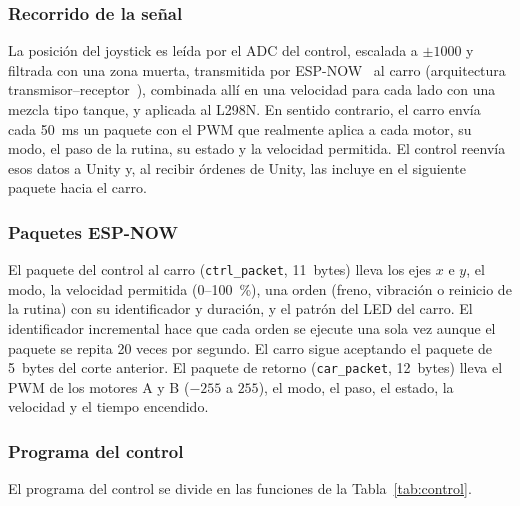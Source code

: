 \documentclass[journal]{IEEEtran}
\begin{document}
\subsubsection{Recorrido de la señal}
La posición del joystick es leída por el ADC del control, escalada a $\pm1000$ y filtrada con una zona muerta, transmitida por ESP-NOW~\cite{espnow} al carro (arquitectura transmisor--receptor~\cite{hossain}), combinada allí en una velocidad para cada lado con una mezcla tipo tanque, y aplicada al L298N. En sentido contrario, el carro envía cada 50~ms un paquete con el PWM que realmente aplica a cada motor, su modo, el paso de la rutina, su estado y la velocidad permitida. El control reenvía esos datos a Unity y, al recibir órdenes de Unity, las incluye en el siguiente paquete hacia el carro.

\subsubsection{Paquetes ESP-NOW}
El paquete del control al carro (\texttt{ctrl\_packet}, 11~bytes) lleva los ejes $x$ e $y$, el modo, la velocidad permitida (0--100~\%), una orden (freno, vibración o reinicio de la rutina) con su identificador y duración, y el patrón del LED del carro. El identificador incremental hace que cada orden se ejecute una sola vez aunque el paquete se repita 20 veces por segundo. El carro sigue aceptando el paquete de 5~bytes del corte anterior. El paquete de retorno (\texttt{car\_packet}, 12~bytes) lleva el PWM de los motores A y B ($-255$ a $255$), el modo, el paso, el estado, la velocidad y el tiempo encendido.

\subsubsection{Programa del control}
El programa del control se divide en las funciones de la Tabla~\ref{tab:control}.
\end{document}
